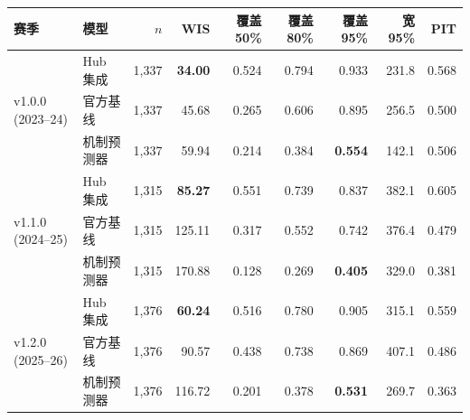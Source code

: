 \begin{tabular}{@{}llrrrrrrr@{}}
\toprule
赛季 & 模型 & $n$ & WIS & 覆盖 50\% & 覆盖 80\% & 覆盖 95\% & 宽 95\% & PIT \\
\midrule
\multirow{3}{*}{v1.0.0 (2023--24)}
& Hub 集成 & 1,337 & \textbf{34.00} & 0.524 & 0.794 & 0.933 & 231.8 & 0.568 \\
& 官方基线 & 1,337 & 45.68 & 0.265 & 0.606 & 0.895 & 256.5 & 0.500 \\
& 机制预测器 & 1,337 & 59.94 & 0.214 & 0.384 & \textbf{0.554} & 142.1 & 0.506 \\
\midrule
\multirow{3}{*}{v1.1.0 (2024--25)}
& Hub 集成 & 1,315 & \textbf{85.27} & 0.551 & 0.739 & 0.837 & 382.1 & 0.605 \\
& 官方基线 & 1,315 & 125.11 & 0.317 & 0.552 & 0.742 & 376.4 & 0.479 \\
& 机制预测器 & 1,315 & 170.88 & 0.128 & 0.269 & \textbf{0.405} & 329.0 & 0.381 \\
\midrule
\multirow{3}{*}{v1.2.0 (2025--26)}
& Hub 集成 & 1,376 & \textbf{60.24} & 0.516 & 0.780 & 0.905 & 315.1 & 0.559 \\
& 官方基线 & 1,376 & 90.57 & 0.438 & 0.738 & 0.869 & 407.1 & 0.486 \\
& 机制预测器 & 1,376 & 116.72 & 0.201 & 0.378 & \textbf{0.531} & 269.7 & 0.363 \\
\bottomrule
\end{tabular}
